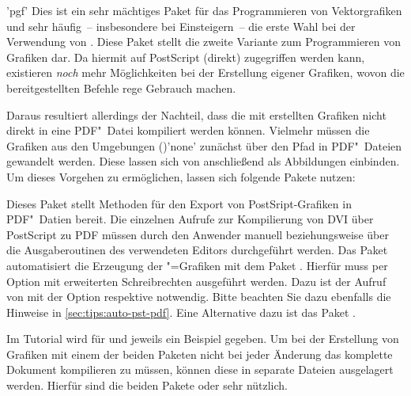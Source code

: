 \begin{DeclarePackages}[Grafiken|?]
'pgf'
  Dies ist ein sehr mächtiges Paket für das Programmieren von Vektorgrafiken 
  und sehr häufig~-- insbesondere bei Einsteigern~-- die erste Wahl bei der 
  Verwendung von .
  Diese Paket stellt die zweite Variante zum Programmieren von Grafiken dar. 
  Da hiermit auf PostScript (direkt) zugegriffen werden kann, existieren 
  \emph{noch} mehr Möglichkeiten bei der Erstellung eigener Grafiken, wovon
  die bereitgestellten Befehle rege Gebrauch machen. 
  
  Daraus resultiert allerdings der Nachteil, dass die mit  
  erstellten Grafiken nicht direkt in eine PDF"~Datei kompiliert werden können. 
  Vielmehr müssen die Grafiken aus den Umgebungen 
  ()'none' zunächst über den Pfad 
   in PDF"~Dateien gewandelt werden. Diese 
  lassen sich von  anschließend als Abbildungen einbinden. Um 
  dieses Vorgehen zu ermöglichen, lassen sich folgende Pakete nutzen:
  \begin{DeclarePackages}
    Dieses Paket stellt Methoden für den Export von PostSript-Grafiken in 
    PDF"~Datien bereit. Die einzelnen Aufrufe zur Kompilierung von DVI über 
    PostScript zu PDF müssen durch den Anwender manuell beziehungsweise über 
    die Ausgaberoutinen des verwendeten Editors durchgeführt werden.
    Das Paket automatisiert die Erzeugung der "=Grafiken mit 
    dem Paket . Hierfür muss  per Option mit 
    erweiterten Schreibrechten ausgeführt werden. Dazu ist der Aufruf von 
     mit der Option  respektive 
     notwendig. Bitte beachten Sie dazu ebenfalls die 
    Hinweise in \autoref{sec:tips:auto-pst-pdf}. Eine Alternative dazu ist das 
    Paket .
  \end{DeclarePackages}
\end{DeclarePackages}

Im Tutorial  wird für  und  
jeweils ein Beispiel gegeben. Um bei der Erstellung von Grafiken mit einem der 
beiden Paketen nicht bei jeder Änderung das komplette Dokument kompilieren zu 
müssen, können diese in separate Dateien ausgelagert werden. Hierfür sind die 
beiden Pakete  oder  sehr nützlich.

